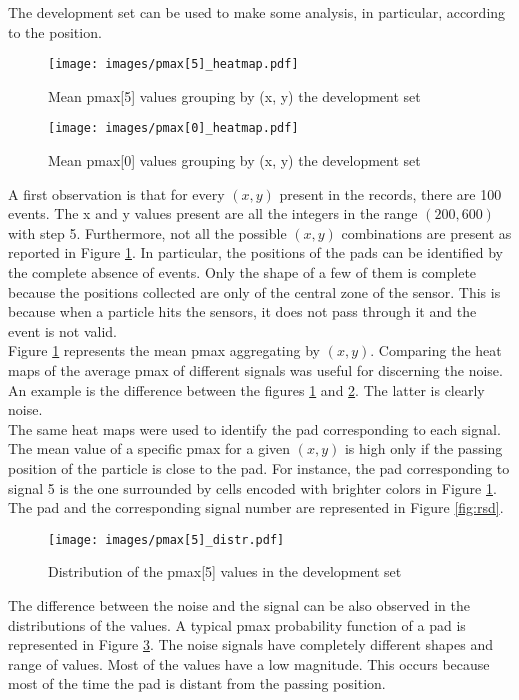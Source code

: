 \documentclass[conference]{IEEEtran}
\begin{document}
The development set can be used to make some analysis, in particular, according to the position.\\
\begin{figure}[htbp]
\centerline{\texttt{[image: images/pmax[5]\_heatmap.pdf]}}
\caption{Mean pmax[5] values grouping by (x, y) the development set}
\label{fig:pmax[5]_heatmap}
\end{figure}
\begin{figure}[htbp]
\centerline{\texttt{[image: images/pmax[0]\_heatmap.pdf]}}
\caption{Mean pmax[0] values grouping by (x, y) the development set}
\label{fig:pmax[0]_heatmap}
\end{figure}
A first observation is that for every $(x, y)$ present in the records, there are 100 events. The x and y values present are all the integers in the range $(200, 600)$ with step 5. Furthermore, not all the possible $(x, y)$ combinations are present as reported in Figure 
\ref{fig:pmax[5]_heatmap}. In particular, the positions of the pads can be identified by the complete absence of events. Only the shape of a few of them is complete because the positions collected are only of the central zone of the sensor. This is because when a particle hits the sensors, it does not pass through it and the event is not valid. \\%

Figure \ref{fig:pmax[5]_heatmap} represents the mean pmax aggregating by $(x, y)$. Comparing the heat maps of the average pmax of different signals was useful for discerning the noise. An example is the difference between the figures \ref{fig:pmax[5]_heatmap} and \ref{fig:pmax[0]_heatmap}. The latter is clearly noise. \\
The same heat maps were used to identify the pad corresponding to each signal. The mean value of a specific pmax for a given $(x, y)$ is high only if the passing position of the particle is close to the pad. For instance, the pad corresponding to signal 5 is the one surrounded by cells encoded with brighter colors in Figure \ref{fig:pmax[5]_heatmap}.
The pad and the corresponding signal number are represented in Figure \ref{fig:rsd}.\\

\begin{figure}[htbp]
\centerline{\texttt{[image: images/pmax[5]\_distr.pdf]}}
\caption{Distribution of the pmax[5] values in the development set}
\label{fig:pmax[5]_distr}
\end{figure}
The difference between the noise and the signal can be also observed in the distributions of the values. A typical pmax probability function of a pad is represented in Figure \ref{fig:pmax[5]_distr}. The noise signals have completely different shapes and range of values. Most of the values have a low magnitude. This occurs because most of the time the pad is distant from the passing position.\\
\end{document}

